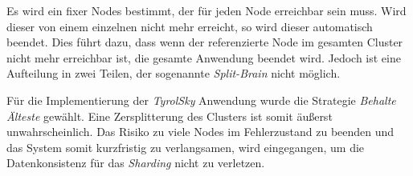 \begin{itemize}
    Es wird ein fixer Nodes bestimmt, der für jeden Node erreichbar sein muss. Wird dieser von einem einzelnen nicht mehr erreicht, so wird dieser automatisch beendet. Dies führt dazu, dass wenn der referenzierte Node im gesamten Cluster nicht mehr erreichbar ist, die gesamte Anwendung beendet wird. Jedoch ist eine Aufteilung in zwei Teilen, der sogenannte \textit{Split-Brain} nicht möglich.
\end{itemize}
Für die Implementierung der \textit{TyrolSky} Anwendung wurde die Strategie \textit{Behalte Älteste} gewählt. Eine Zersplitterung des Clusters ist somit äußerst unwahrscheinlich. Das Risiko zu viele Nodes im Fehlerzustand zu beenden und das System somit kurzfristig zu verlangsamen, wird eingegangen, um die Datenkonsistenz für das \textit{Sharding} nicht zu verletzen.   

